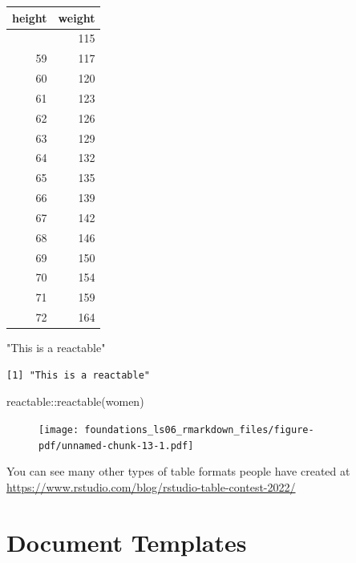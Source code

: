 \documentclass[
  letterpaper,
  DIV=11,
  numbers=noendperiod]{scrreprt}
\newenvironment{Shaded}{\begin{snugshade}}{\end{snugshade}}
\newcommand{\FunctionTok}[1]{\textcolor[rgb]{0.28,0.35,0.67}{#1}}
\newcommand{\NormalTok}[1]{\textcolor[rgb]{0.00,0.23,0.31}{#1}}
\newcommand{\SpecialCharTok}[1]{\textcolor[rgb]{0.37,0.37,0.37}{#1}}
\newcommand{\StringTok}[1]{\textcolor[rgb]{0.13,0.47,0.30}{#1}}
\begin{document}
\begin{longtable*}{rr}
\toprule
height & weight \\ 
\midrule{} & 115 \\ 
59 & 117 \\ 
60 & 120 \\ 
61 & 123 \\ 
62 & 126 \\ 
63 & 129 \\ 
64 & 132 \\ 
65 & 135 \\ 
66 & 139 \\ 
67 & 142 \\ 
68 & 146 \\ 
69 & 150 \\ 
70 & 154 \\ 
71 & 159 \\ 
72 & 164 \\ 
\bottomrule
\end{longtable*}

\begin{Shaded}
\begin{Highlighting}[]
\StringTok{"This is a reactable"}
\end{Highlighting}
\end{Shaded}

\begin{verbatim}
[1] "This is a reactable"
\end{verbatim}

\begin{Shaded}
\begin{Highlighting}[]
\NormalTok{reactable}\SpecialCharTok{::}\FunctionTok{reactable}\NormalTok{(women)}
\end{Highlighting}
\end{Shaded}

\begin{figure}[H]

{\centering \texttt{[image: foundations\_ls06\_rmarkdown\_files/figure-pdf/unnamed-chunk-13-1.pdf]}

}

\end{figure}

You can see many other types of table formats people have created at
\url{https://www.rstudio.com/blog/rstudio-table-contest-2022/}

\hypertarget{document-templates}{%
\section{Document Templates}\label{document-templates}}
\end{document}
